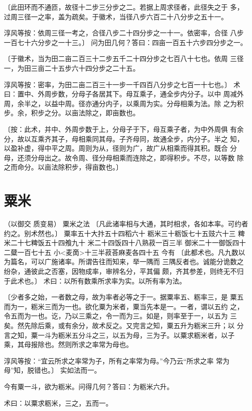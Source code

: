 \documentclass[12pt,UTF8]{ctexbook}
\begin{document}
〔此田环而不通匝，故径十二步三分步之二。若据上周求径者，此径失之于 多，过周三径一之率，盖为疏矣。于徽术，当径八步六百二十八分步之五十一。

淳风等按：依周三径一考之，合径八步二十四分步之一十一。依密率，合径 八步一百七十六分步之一十三。〕 问为田几何？答曰：四亩一百五十六步四分步之一。

〔于徽术，当为田二亩二百三十二步五千二十四分步之七百八十七也。依周 三径一，为田三亩二十五步六十四分步之二十五。

淳风等按：密率，为田二亩二百三十一步一千四百八分步之七百一十七也。〕 术曰：置中、外周步数，分母子各居其下。母互乘子，通全步内分子。以中 周减外周，余半之，以益中周。径亦通分内子，以乘周为实。分母相乘为法。除 之为积步。余，积步之分。以亩法除之，即亩数也。

〔按：此术，并中、外周步数于上，分母子于下，母互乘子者，为中外周俱 有余分，故以互乘齐其子，母相乘同其母。子齐母同，故通全步，内分子。半之 知，以盈补虚，得中平之周。周则为从，径则为广，故广从相乘而得其积。既合 分母，还须分母出之。故令周、径分母相乘而连除之，即得积步。不尽，以等数 除之而命分。以亩法除积步，得亩数也。〕 

\chapter{粟米}
（以御交 质变易） 粟米之法 〔凡此诸率相与大通，其时相求，各如本率。可约者约之。别术然也。〕 粟率五十大抃五十四稻六十 粝米三十粝饭七十五豉六十三 粺米二十七粺饭五十四飧九十 米二十四饭四十八熟菽一百三半 御米二十一御饭四十二糵一百七十五 小<麦啇>十三半菽荅麻麦各四十五 今有 〔此都术也。凡九数以为篇名，可以广施诸率。所谓告往而知来，举一隅而 三隅反者也。诚能分诡数之纷杂，通彼此之否塞，因物成率，审辨名分，平其偏 颇，齐其参差，则终无不归于此术也。〕 术曰：以所有数乘所求率为实。以所有率为法。

〔少者多之始，一者数之母，故为率者必等之于一。据粟率五、粝率三，是 粟五而为一，粝米三而为一也。欲化粟为米者，粟当先本是一。一者，谓以五约 之，令五而为一也。讫，乃以三乘之，令一而为三。如是，则率至于一，以五为 三矣。然先除后乘，或有余分，故术反之。又完言之知，粟五升为粝米三升；以 分言之知，粟一斗为粝米五分斗之三，以五为母，三为子。以粟求粝米者，以子 乘，其母报除也。然则所求之率常为母也。

淳风等按：“宜云所求之率常为子，所有之率常为母。”今乃云“所求之率 常为母”知，脱错也。〕 实如法而一。

今有粟一斗，欲为粝米。问得几何？答曰：为粝米六升。

术曰：以粟求粝米，三之，五而一。
\end{document}
